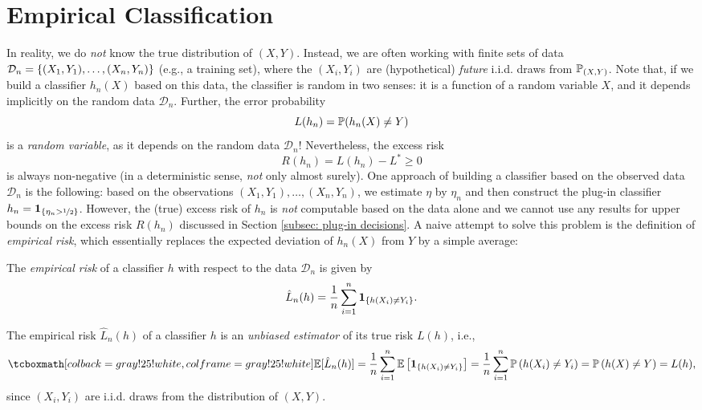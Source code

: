 \section{Empirical Classification}
\label{subsec: empirical classification}

In reality, we do \emph{not} know the true distribution of $(X, Y)$. Instead, we are often working with finite sets of data $\mathcal{D}_n = \set{(X_1, Y_1), \dots, (X_n, Y_n)}$ (e.g., a training set), where the $(X_i, Y_i)$ are (hypothetical) \emph{future} i.i.d. draws from $\P_{(X, Y)}$. Note that, if we build a classifier $h_n(X)$ based on this data, the classifier is random in two senses: it is a function of a random variable $X$, and it depends implicitly on the random data $\mathcal{D}_n$. Further, the error probability
\[
    L(h_n) = \P(h_n (X) \neq Y)
\]
is a \emph{random variable}, as it depends on the random data $\mathcal{D}_n$! Nevertheless, the excess risk
\[
    R(h_n) = L(h_n) - L^* \geq 0
\]
is always non-negative (in a deterministic sense, \emph{not} only almost surely). One approach of building a classifier based on the observed data $\mathcal{D}_n$ is the following: based on the observations $(X_1, Y_1), \dots, (X_n, Y_n)$, we estimate $\eta$ by $\eta_n$ and then construct the plug-in classifier $h_n = \indSet{\eta_n > \nicefrac{1}{2}}$. However, the (true) excess risk of $h_n$ is \emph{not} computable based on the data alone and we cannot use any results for upper bounds on the excess risk $R(h_n)$ discussed in Section \ref{subsec: plug-in decisions}. A naive attempt to solve this problem is the definition of \emph{empirical risk}, which essentially replaces the expected deviation of $h_n(X)$ from $Y$ by a simple average:

\begin{definition}
The \emph{empirical risk} of a classifier $h$ with respect to the data $\mathcal{D}_n$ is given by
\[
    \hat L_n(h) = \frac{1}{n} \sum_{i=1}^n \indSet{h(X_i) \neq Y_i}.
\]
\end{definition}

The empirical risk $\hat L_n(h)$ of a classifier $h$ is an \emph{unbiased estimator} of its true risk $L(h)$, i.e.,
\begin{equation}
\label{eq: bias of empirical risk}
    \highlightMath{
        \ex{\hat L_n(h)} = \frac{1}{n} \sum_{i=1}^n \Ex{\indSet{h(X_i) \neq Y_i}} = \frac{1}{n} \sum_{i=1}^n \Pr{h(X_i) \neq Y_i} = \Pr{h(X) \neq Y} = L(h),
    }
\end{equation}
since $(X_i, Y_i)$ are i.i.d. draws from the distribution of $(X, Y)$.

